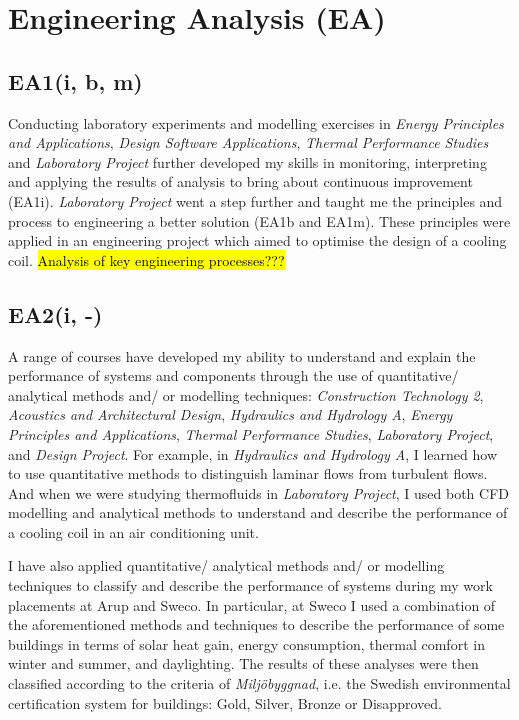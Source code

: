 \section{Engineering Analysis (EA)}

\subsection*{EA1(i, b, m)}

Conducting laboratory experiments and modelling exercises in \textit{Energy Principles and Applications}, \textit{Design Software Applications}, \textit{Thermal Performance Studies} and \textit{Laboratory Project} further developed my skills in monitoring, interpreting and applying the results of analysis to bring about continuous improvement (EA1i).
\textit{Laboratory Project} went a step further and taught me the principles and process to engineering a better solution (EA1b and EA1m).
These principles were applied in an engineering project which aimed to optimise the design of a cooling coil.
\hl{Analysis of key engineering processes???}


\subsection*{EA2(i, -)}

A range of courses have developed my ability to understand and explain the performance of systems and components through the use of quantitative/ analytical methods and/ or modelling techniques:
\textit{Construction Technology 2},
\textit{Acoustics and Architectural Design},
\textit{Hydraulics and Hydrology A},
\textit{Energy Principles and Applications},
\textit{Thermal Performance Studies},
\textit{Laboratory Project},
and \textit{Design Project}.
For example, in \textit{Hydraulics and Hydrology A}, I learned how to use quantitative methods to distinguish laminar flows from turbulent flows.
And when we were studying thermofluids in \textit{Laboratory Project}, I used both CFD modelling and analytical methods to understand and describe the performance of a cooling coil in an air conditioning unit.

I have also applied quantitative/ analytical methods and/ or modelling techniques to classify and describe the performance of systems during my work placements at Arup and Sweco.
In particular, at Sweco I used a combination of the aforementioned methods and techniques to describe the performance of some buildings in terms of solar heat gain, energy consumption, thermal comfort in winter and summer, and daylighting.
The results of these analyses were then classified according to the criteria of \textit{Miljöbyggnad}, i.e. the Swedish environmental certification system for buildings: Gold, Silver, Bronze or Disapproved.


